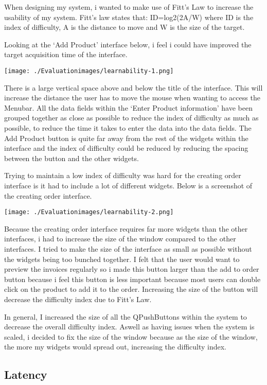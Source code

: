 When designing my system, i wanted to make use of Fitt's Law to increase the usability of my system. Fitt's law states that: ID=log2(2A/W) where ID is the index of difficulty, A is the distance to move and W is the size of the target.

Looking at the `Add Product' interface below, i feel i could have improved the target acquisition time of the interface.

\texttt{[image: ./Evaluationimages/learnability-1.png]}

There is a large vertical space above and below the title of the interface. This will increase the distance the user has to move the mouse when wanting to access the Menubar. All the data fields within the `Enter Product information' have been grouped together as close as possible to reduce the index of difficulty as much as possible, to reduce the time it takes to enter the data into the data fields. The Add Product button is quite far away from the rest of the widgets within the interface and the index of difficulty could be reduced by reducing the spacing between the button and the other widgets.

Trying to maintain a low index of difficulty was hard for the creating order interface is it had to include a lot of different widgets. Below is a screenshot of the
creating order interface.

\texttt{[image: ./Evaluationimages/learnability-2.png]}

Because the creating order interface requires far more widgets than the other interfaces, i had to increase the size of the window compared to the other interfaces. I tried to make the size of the interface as small as possible without the widgets being too bunched together. I felt that the user would want to preview the invoices regularly so i made this button larger than the add to order button because i feel this button is less important because most users can double click on the product to add it to the order. Increasing the size of the button will decrease the difficulty index due to Fitt's Law.

In general, I increased the size of all the QPushButtons within the system to decrease the overall difficulty index. Aswell as having issues when the system is scaled, i decided to fix the size of the window because as the size of the window, the more my widgets would spread out, increasing the difficulty index.

\subsection{Latency}

